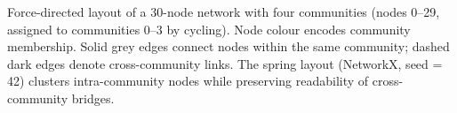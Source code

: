 \caption{Force-directed layout of a 30-node network with four communities (nodes 0--29, assigned to communities 0--3 by cycling). Node colour encodes community membership. Solid grey edges connect nodes within the same community; dashed dark edges denote cross-community links. The spring layout (NetworkX, seed = 42) clusters intra-community nodes while preserving readability of cross-community bridges.}
